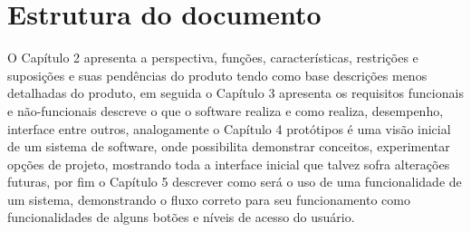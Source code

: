 \section{Estrutura do documento}

O Capítulo 2 apresenta a perspectiva, funções, características, restrições e suposições e suas pendências do produto tendo como base descrições menos detalhadas do produto, em seguida o Capítulo 3 apresenta os requisitos funcionais e não-funcionais descreve o que o software realiza e como realiza, desempenho, interface entre outros, analogamente o Capítulo 4 protótipos é uma visão inicial de um sistema de software, onde possibilita demonstrar conceitos, experimentar opções de projeto, mostrando toda a interface inicial que talvez sofra alterações futuras, por fim o Capítulo 5 descrever como será o uso de uma funcionalidade de um sistema, demonstrando o fluxo correto para seu funcionamento como funcionalidades de alguns botões e níveis de acesso do usuário.